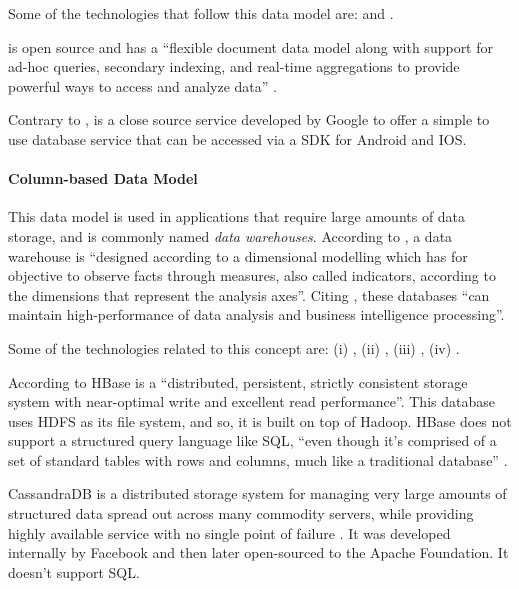 Some of the technologies that follow this data model are:  and .

 is open source and has a ``flexible document data model along with support for ad-hoc queries, secondary indexing, and real-time aggregations to provide powerful ways to access and analyze data'' \parencite{mongodb}.

Contrary to ,  is a close source service developed by Google to offer a simple to use database service that can be accessed via a \gls{SDK} for Android and IOS.

\paragraph{Column-based Data Model}
\label{par:stateofart:arch:infra:store:time}

This data model is used in applications that require large amounts of data storage, and is commonly named \textit{data warehouses}. According to \cite{dehdouh2015using}, a data warehouse  is ``designed according to a dimensional modelling which has for objective to observe facts through measures, also called indicators, according to the dimensions that represent the analysis axes''. Citing \cite{han2011survey}, these databases ``can maintain high-performance of data analysis and business intelligence processing''.

Some of the technologies related to this concept are: (i) , (ii) , (iii) , (iv) .

According to \cite{george2011hbase} HBase is a ``distributed, persistent, strictly consistent storage system with near-optimal write and excellent read performance''. This database uses \gls{HDFS} as its file system, and so, it is built on top of Hadoop.
HBase does not support a structured query language like \gls{SQL}, ``even though it's comprised of a set of standard tables with rows and columns, much like a traditional database'' \parencite{ibm-hbase}.

CassandraDB is a distributed storage system for managing very large amounts of structured data spread out across many commodity servers, while providing highly available service with no single point of failure \parencite{lakshman2010cassandra}.
It was developed internally by Facebook and then later open-sourced to the Apache Foundation. It doesn't support \gls{SQL}.

